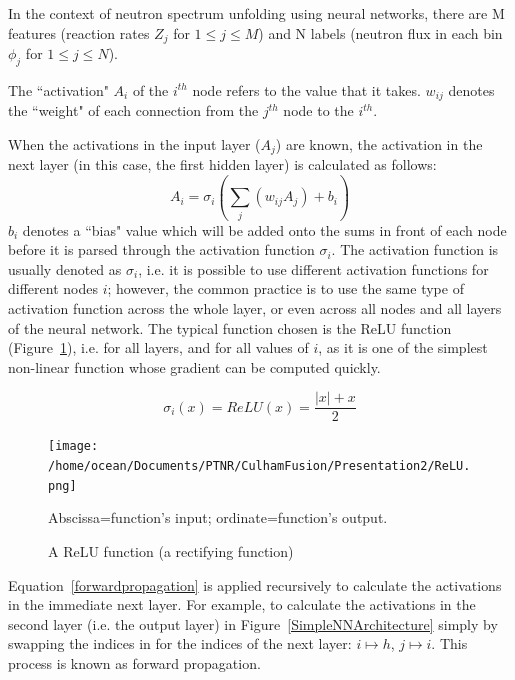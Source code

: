 \documentclass[a4paper, 12pt]{article}
\begin{document}
In the context of neutron spectrum unfolding using neural networks, there are M features (reaction rates $Z_j$ for $1\le j\le M$) and N labels (neutron flux in each bin $\phi_j$ for $1 \le j \le N$). 

The ``activation" $A_i$ of the $i^{th}$ node refers to the value that it takes.
$w_{ij}$ denotes the ``weight" of each connection from the $j^{th}$ node to the $i^{th}$.

When the activations in the input layer ($A_j$) are known, the activation in the next layer (in this case, the first hidden layer) is calculated as follows:
\begin{equation} \label{forwardpropagation}
    A_i = \sigma_i\left({\sum_{j} (w_{ij}A_j) + b_i}\right)
\end{equation}
$b_{i}$ denotes a ``bias" value which will be added onto the sums in front of each node before it is parsed through the activation function $\sigma_i$.
The activation function is usually denoted as $\sigma_{i}$, i.e. it is possible to use different activation functions for different nodes $i$; however, the common practice is to use the same type of activation function across the whole layer, or even across all nodes and all layers of the neural network. The typical function chosen is the ReLU function (Figure~\ref{ReLU}), i.e. for all layers, and for all values of $i$, as it is one of the simplest non-linear function whose gradient can be computed quickly.


\begin{equation}
    \sigma_i(x) = ReLU(x) = \frac{|x|+x}{2}
\end{equation}
\begin{figure}
    \centering
    \texttt{[image: /home/ocean/Documents/PTNR/CulhamFusion/Presentation2/ReLU.png]}
    \caption{A ReLU function (a rectifying function)}\label{ReLU}
    Abscissa=function's input; ordinate=function's output.
\end{figure}

Equation~\ref{forwardpropagation} is applied recursively to calculate the activations in the immediate next layer. For example, to calculate the activations in the second layer (i.e. the output layer) in Figure~\ref{SimpleNNArchitecture} simply by swapping the indices in for the indices of the next layer: $i\mapsto h$, $j\mapsto i$. This process is known as forward propagation.
\end{document}
